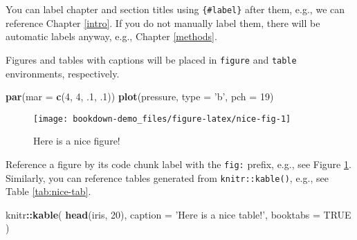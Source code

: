 \documentclass[]{book}
\newenvironment{Shaded}{\begin{snugshade}}{\end{snugshade}}
\newcommand{\KeywordTok}[1]{\textcolor[rgb]{0.13,0.29,0.53}{\textbf{#1}}}
\newcommand{\DataTypeTok}[1]{\textcolor[rgb]{0.13,0.29,0.53}{#1}}
\newcommand{\DecValTok}[1]{\textcolor[rgb]{0.00,0.00,0.81}{#1}}
\newcommand{\StringTok}[1]{\textcolor[rgb]{0.31,0.60,0.02}{#1}}
\newcommand{\OtherTok}[1]{\textcolor[rgb]{0.56,0.35,0.01}{#1}}
\newcommand{\OperatorTok}[1]{\textcolor[rgb]{0.81,0.36,0.00}{\textbf{#1}}}
\newcommand{\NormalTok}[1]{#1}
\theoremstyle{definition}
\theoremstyle{definition}
\theoremstyle{definition}
\theoremstyle{remark}
\begin{document}
You can label chapter and section titles using \texttt{\{\#label\}}
after them, e.g., we can reference Chapter \ref{intro}. If you do not
manually label them, there will be automatic labels anyway, e.g.,
Chapter \ref{methods}.

Figures and tables with captions will be placed in \texttt{figure} and
\texttt{table} environments, respectively.

\begin{Shaded}
\begin{Highlighting}[]
\KeywordTok{par}\NormalTok{(}\DataTypeTok{mar =} \KeywordTok{c}\NormalTok{(}\DecValTok{4}\NormalTok{, }\DecValTok{4}\NormalTok{, .}\DecValTok{1}\NormalTok{, .}\DecValTok{1}\NormalTok{))}
\KeywordTok{plot}\NormalTok{(pressure, }\DataTypeTok{type =} \StringTok{'b'}\NormalTok{, }\DataTypeTok{pch =} \DecValTok{19}\NormalTok{)}
\end{Highlighting}
\end{Shaded}

\begin{figure}

{\centering \texttt{[image: bookdown-demo\_files/figure-latex/nice-fig-1]} 

}

\caption{Here is a nice figure!}\label{fig:nice-fig}
\end{figure}

Reference a figure by its code chunk label with the \texttt{fig:}
prefix, e.g., see Figure \ref{fig:nice-fig}. Similarly, you can
reference tables generated from \texttt{knitr::kable()}, e.g., see Table
\ref{tab:nice-tab}.

\begin{Shaded}
\begin{Highlighting}[]
\NormalTok{knitr}\OperatorTok{::}\KeywordTok{kable}\NormalTok{(}
  \KeywordTok{head}\NormalTok{(iris, }\DecValTok{20}\NormalTok{), }\DataTypeTok{caption =} \StringTok{'Here is a nice table!'}\NormalTok{,}
  \DataTypeTok{booktabs =} \OtherTok{TRUE}
\NormalTok{)}
\end{Highlighting}
\end{Shaded}
\end{document}
